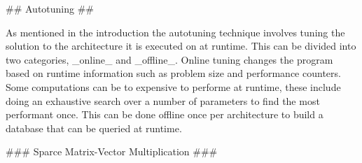 \begin{markdown}

## Autotuning ##

As mentioned in the introduction the autotuning technique involves
tuning the solution to the architecture it is executed on at
runtime. This can be divided into two categories, _online_ and
_offline_. Online tuning changes the program based on runtime
information such as problem size and performance counters. Some
computations can be to expensive to performe at runtime, these include
doing an exhaustive search over a number of parameters to find the
most performant once. This can be done offline once per architecture
to build a database that can be queried at runtime.

### Sparce Matrix-Vector Multiplication ###


\end{markdown}
